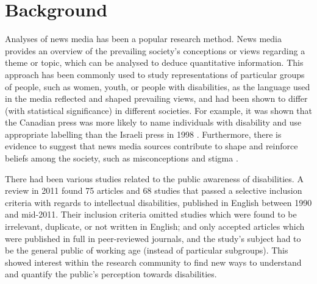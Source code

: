 \documentclass{report}
\begin{document}
\section{Background} \label{Background}  %

Analyses of news media has been a popular research method.
News media provides an overview of the prevailing society's conceptions or views regarding a theme or topic, which can be analysed to deduce quantitative information.
This approach has been commonly used to study representations of particular groups of people, such as women, youth, or people with disabilities, as the language used in the media reflected and shaped prevailing views, and had been shown to differ (with statistical significance) in different societies.
For example, it was shown that the Canadian press was more likely to name individuals with disability and use appropriate labelling than the Israeli press in 1998 \cite{gold1999media}.
Furthermore, there is evidence to suggest that news media sources contribute to shape and reinforce beliefs among the society, such as misconceptions and stigma \cite{wahl1992mass}.

There had been various studies related to the public awareness of disabilities.
A review in 2011 \cite{scior2011public} found 75 articles and 68 studies that passed a selective inclusion criteria with regards to intellectual disabilities, published in English between 1990 and mid-2011. 
Their inclusion criteria omitted studies which were found to be irrelevant, duplicate, or not written in English; and only accepted articles which were published in full in peer-reviewed journals, and the study's subject had to be the general public of working age (instead of particular subgroups).
This showed interest within the research community to find new ways to understand and quantify the public's perception towards disabilities.
\end{document}
